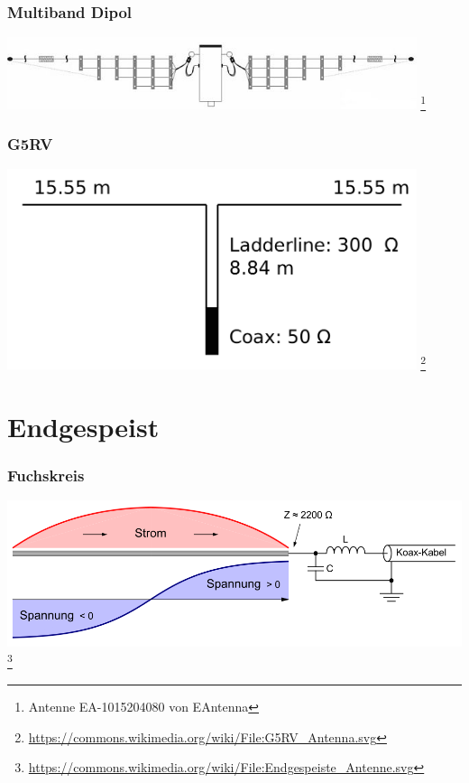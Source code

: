 \begin{frame}
    \frametitle{Multiband Dipol}
    \begin{center}
        \includegraphics[width=0.9\textwidth]{e11/Multiband.jpg}
        \footnote{\tiny Antenne EA-1015204080 von EAntenna}
	\end{center}
\end{frame}

\begin{frame}
    \frametitle{G5RV}
    \begin{center}
        \includegraphics[width=0.9\textwidth]{e11/G5RV_Antenna.png}
        \footnote{\tiny \url{https://commons.wikimedia.org/wiki/File:G5RV_Antenna.svg}}
	\end{center}
\end{frame}

\section*{Endgespeist}

\begin{frame}
    \frametitle{Fuchskreis}
    \begin{center}
        \includegraphics[width=1\textwidth]{e11/1000px-Endgespeiste_Antenne.png}
        \footnote{\tiny \url{https://commons.wikimedia.org/wiki/File:Endgespeiste_Antenne.svg}}
	\end{center}
\end{frame}


